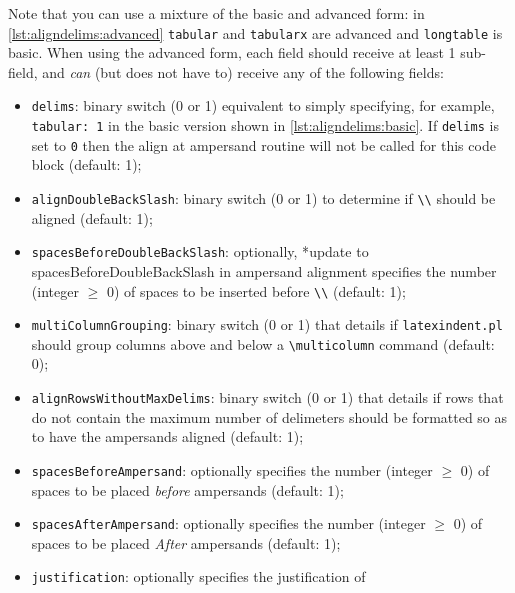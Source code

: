 	Note that you can use a mixture of the basic and advanced form: in
	\cref{lst:aligndelims:advanced} \texttt{tabular} and \texttt{tabularx} are advanced
	and \texttt{longtable} is basic. When using the advanced form, each field should
	receive at least 1 sub-field, and \emph{can}
	(but does not have to) receive any of the following
	fields:
	\begin{itemize}
		\item \texttt{delims}: binary switch (0 or 1) equivalent to simply specifying, for
		      example, \texttt{tabular: 1} in the basic version shown in \cref{lst:aligndelims:basic}. If
		      \texttt{delims} is set to \texttt{0} then the align at ampersand
		      routine will not be called for this code block (default: 1);
		\item \texttt{alignDoubleBackSlash}: binary switch (0 or 1) to determine if \lstinline!\\!
		      should be aligned (default: 1);
		\item \texttt{spacesBeforeDoubleBackSlash}: optionally,%
		      *{update to spacesBeforeDoubleBackSlash in ampersand alignment} specifies the number (integer $\geq$ 0) of spaces
		      to be inserted before \lstinline!\\! (default: 1);
		\item {} \texttt{multiColumnGrouping}: binary switch (0 or 1) that details if
		      \texttt{latexindent.pl} should group columns
		      above and below a \lstinline!\multicolumn! command (default: 0);
		\item {} \texttt{alignRowsWithoutMaxDelims}: binary switch (0 or 1) that details if
		      rows that do not contain the maximum number of delimeters should be formatted so as to
		      have the ampersands aligned (default: 1);
		\item {}\texttt{spacesBeforeAmpersand}: optionally specifies the number (integer
		      $\geq$ 0) of
		      spaces to be placed \emph{before} ampersands (default: 1);
		\item {}\texttt{spacesAfterAmpersand}: optionally specifies the number (integer
		      $\geq$ 0) of
		      spaces to be placed \emph{After} ampersands (default: 1);
		\item {}\texttt{justification}: optionally specifies the justification of

\end{itemize}
